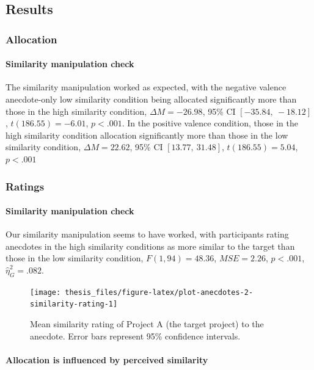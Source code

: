 \documentclass[a4paper, nobind, dvipsnames]{templates/ociamthesis}
\theoremstyle{definition}
\theoremstyle{definition}
\theoremstyle{definition}
\theoremstyle{definition}
\theoremstyle{remark}
\begin{document}
\hypertarget{results-anecdotes-2-appendix}{%
\subsection{Results}\label{results-anecdotes-2-appendix}}

\subsubsection{Allocation}

\paragraph{Similarity manipulation check}

The similarity manipulation worked as expected, with the negative valence
anecdote-only low similarity condition being allocated significantly more than
those in the high similarity condition,
\(\Delta M = -26.98\), 95\% CI \([-35.84,~-18.12]\), \(t(186.55) = -6.01\), \(p < .001\). In the
positive valence condition, those in the high similarity condition allocation
significantly more than those in the low similarity condition,
\(\Delta M = 22.62\), 95\% CI \([13.77,~31.48]\), \(t(186.55) = 5.04\), \(p < .001\)

\subsubsection{Ratings}

\paragraph{Similarity manipulation check}

Our similarity manipulation seems to have worked, with participants rating
anecdotes in the high similarity conditions as more similar to the target than
those in the low similarity condition,
\(F(1, 94) = 48.36\), \(\mathit{MSE} = 2.26\), \(p < .001\), \(\hat{\eta}^2_G = .082\).



\begin{figure}
\texttt{[image: thesis\_files/figure-latex/plot-anecdotes-2-similarity-rating-1]} \caption{Mean similarity rating of Project A (the target project) to the anecdote. Error bars represent 95\% confidence intervals.}\label{fig:plot-anecdotes-2-similarity-rating}
\end{figure}

\paragraph{Allocation is influenced by perceived similarity}
\end{document}
